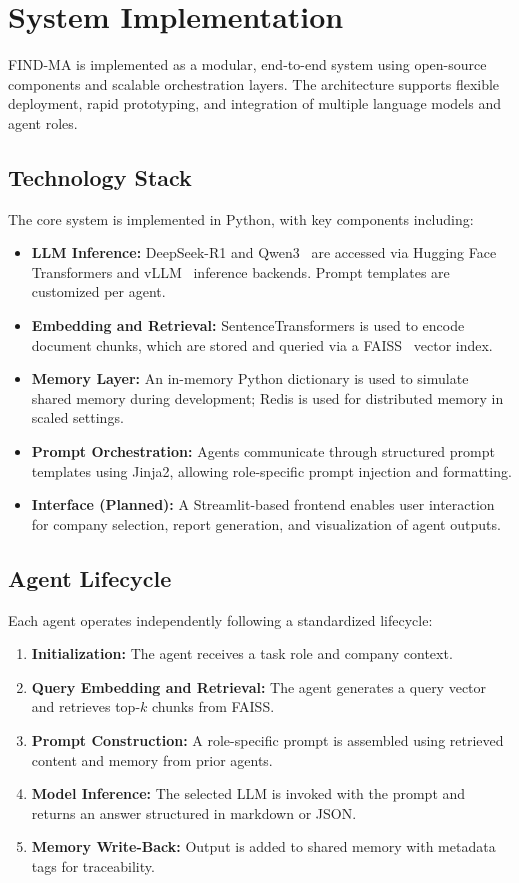 \documentclass[11pt]{article}
\newcommand{\findma}{\textsc{FIND-MA}}
\begin{document}
\section{System Implementation}
\label{sec:implementation}
\findma{} is implemented as a modular, end-to-end system using open-source components and scalable orchestration layers. The architecture supports flexible deployment, rapid prototyping, and integration of multiple language models and agent roles.

\subsection*{Technology Stack}
The core system is implemented in Python, with key components including:
\begin{itemize}
    \item \textbf{LLM Inference:} DeepSeek-R1 and Qwen3~\citep{yang2024qwen2} are accessed via Hugging Face Transformers and vLLM~\citep{kwon2023vllm} inference backends. Prompt templates are customized per agent.
    \item \textbf{Embedding and Retrieval:} SentenceTransformers is used to encode document chunks, which are stored and queried via a FAISS~\citep{johnson2017faiss} vector index.
    \item \textbf{Memory Layer:} An in-memory Python dictionary is used to simulate shared memory during development; Redis is used for distributed memory in scaled settings.
    \item \textbf{Prompt Orchestration:} Agents communicate through structured prompt templates using Jinja2, allowing role-specific prompt injection and formatting.
    \item \textbf{Interface (Planned):} A Streamlit-based frontend enables user interaction for company selection, report generation, and visualization of agent outputs.
\end{itemize}

\subsection*{Agent Lifecycle}
Each agent operates independently following a standardized lifecycle:
\begin{enumerate}
    \item \textbf{Initialization:} The agent receives a task role and company context.
    \item \textbf{Query Embedding and Retrieval:} The agent generates a query vector and retrieves top-$k$ chunks from FAISS.
    \item \textbf{Prompt Construction:} A role-specific prompt is assembled using retrieved content and memory from prior agents.
    \item \textbf{Model Inference:} The selected LLM is invoked with the prompt and returns an answer structured in markdown or JSON.
    \item \textbf{Memory Write-Back:} Output is added to shared memory with metadata tags for traceability.
\end{enumerate}
\end{document}
